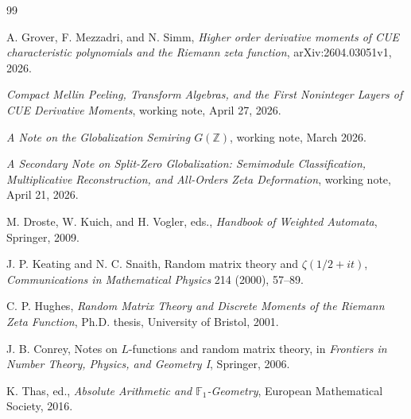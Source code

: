\documentclass[11pt]{article}
\begin{document}
\begin{thebibliography}{99}

A. Grover, F. Mezzadri, and N. Simm,
\emph{Higher order derivative moments of CUE characteristic polynomials and the Riemann zeta function},
arXiv:2604.03051v1, 2026.

\emph{Compact Mellin Peeling, Transform Algebras, and the First Noninteger Layers of CUE Derivative Moments},
working note, April 27, 2026.

\emph{A Note on the Globalization Semiring $G(\mathbb Z)$},
working note, March 2026.

\emph{A Secondary Note on Split-Zero Globalization: Semimodule Classification, Multiplicative Reconstruction, and All-Orders Zeta Deformation},
working note, April 21, 2026.

M. Droste, W. Kuich, and H. Vogler, eds.,
\emph{Handbook of Weighted Automata}, Springer, 2009.

J. P. Keating and N. C. Snaith,
Random matrix theory and $\zeta(1/2+it)$,
\emph{Communications in Mathematical Physics} 214 (2000), 57--89.

C. P. Hughes,
\emph{Random Matrix Theory and Discrete Moments of the Riemann Zeta Function},
Ph.D. thesis, University of Bristol, 2001.

J. B. Conrey,
Notes on $L$-functions and random matrix theory,
in \emph{Frontiers in Number Theory, Physics, and Geometry I}, Springer, 2006.

K. Thas, ed.,
\emph{Absolute Arithmetic and $\mathbb F_1$-Geometry}, European Mathematical Society, 2016.

\end{thebibliography}
\end{document}
